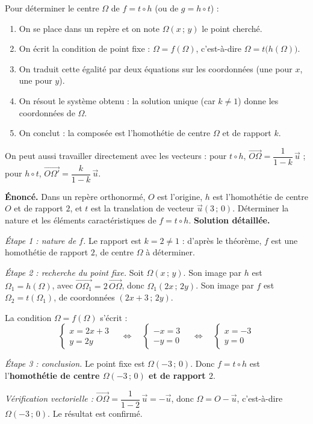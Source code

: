 \documentclass[11pt]{article}
\begin{document}
\begin{methode}
Pour déterminer le centre $\Omega$ de $f = t \circ h$ (ou de $g = h \circ t$) :
\begin{enumerate}
\item On se place dans un repère et on note $\Omega(x\,;\,y)$ le point cherché.
\item On écrit la condition de point fixe : $\Omega = f(\Omega)$, c'est-à-dire $\Omega = t\big(h(\Omega)\big)$.
\item On traduit cette égalité par deux équations sur les coordonnées (une pour $x$, une pour $y$).
\item On résout le système obtenu : la solution unique (car $k \neq 1$) donne les coordonnées de $\Omega$.
\item On conclut : la composée est l'homothétie de centre $\Omega$ et de rapport $k$.
\end{enumerate}
On peut aussi travailler directement avec les vecteurs : pour $t \circ h$, $\overrightarrow{O\Omega} = \dfrac{1}{1-k}\,\vec{u}$ ; pour $h \circ t$, $\overrightarrow{O\Omega'} = \dfrac{k}{1-k}\,\vec{u}$.
\end{methode}

\begin{exoresolu}
\textbf{Énoncé.} Dans un repère orthonormé, $O$ est l'origine, $h$ est l'homothétie de centre $O$ et de rapport $2$, et $t$ est la translation de vecteur $\vec{u}(3\,;\,0)$. Déterminer la nature et les éléments caractéristiques de $f = t \circ h$.
\tcblower
\textbf{Solution détaillée.}

\emph{Étape 1 : nature de $f$.} Le rapport est $k = 2 \neq 1$ : d'après le théorème, $f$ est une homothétie de rapport $2$, de centre $\Omega$ à déterminer.

\emph{Étape 2 : recherche du point fixe.} Soit $\Omega(x\,;\,y)$. Son image par $h$ est $\Omega_1 = h(\Omega)$, avec $\overrightarrow{O\Omega_1} = 2\,\overrightarrow{O\Omega}$, donc $\Omega_1(2x\,;\,2y)$. Son image par $f$ est $\Omega_2 = t(\Omega_1)$, de coordonnées $(2x + 3\,;\,2y)$.

La condition $\Omega = f(\Omega)$ s'écrit :
\[
\begin{cases}
x = 2x + 3 \\
y = 2y
\end{cases}
\quad\Longleftrightarrow\quad
\begin{cases}
-x = 3 \\
-y = 0
\end{cases}
\quad\Longleftrightarrow\quad
\begin{cases}
x = -3 \\
y = 0
\end{cases}
\]

\emph{Étape 3 : conclusion.} Le point fixe est $\Omega(-3\,;\,0)$. Donc $f = t \circ h$ est l'\textbf{homothétie de centre $\Omega(-3\,;\,0)$ et de rapport $2$}.

\emph{Vérification vectorielle :} $\overrightarrow{O\Omega} = \dfrac{1}{1-2}\,\vec{u} = -\vec{u}$, donc $\Omega = O - \vec{u}$, c'est-à-dire $\Omega(-3\,;\,0)$. Le résultat est confirmé.
\end{exoresolu}
\end{document}
